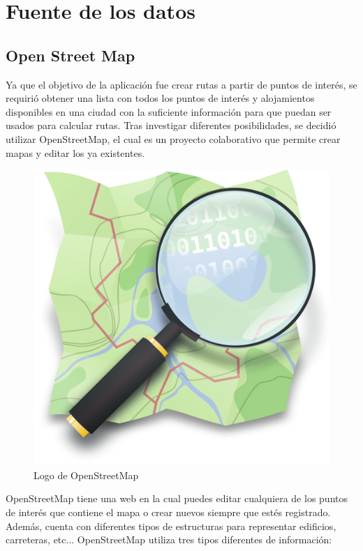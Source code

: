 \section[Fuente de los datos]{Fuente de los datos}
\subsection[OSM]{Open Street Map}
Ya que el objetivo de la aplicación fue crear rutas a partir de puntos de interés, se requirió obtener una lista con todos los puntos de interés y alojamientos disponibles en una ciudad con la suficiente información para que puedan ser usados para calcular rutas.\newline
Tras investigar diferentes posibilidades, se decidió utilizar OpenStreetMap, el cual es un proyecto colaborativo que permite crear mapas y editar los ya existentes.\newline
\begin{figure}[H]
	\centering
	\includegraphics[scale=0.05]{imagenes/Openstreetmap_logo}
	\caption{Logo de OpenStreetMap}
	\label{fig:openstreetmap}
\end{figure}
OpenStreetMap tiene una web \cite{openstreetmap} en la cual puedes editar cualquiera de los puntos de interés que contiene el mapa o crear nuevos siempre que estés registrado. Además, cuenta con diferentes tipos de estructuras para representar edificios, carreteras, etc... OpenStreetMap utiliza tres tipos diferentes de información:\newline
